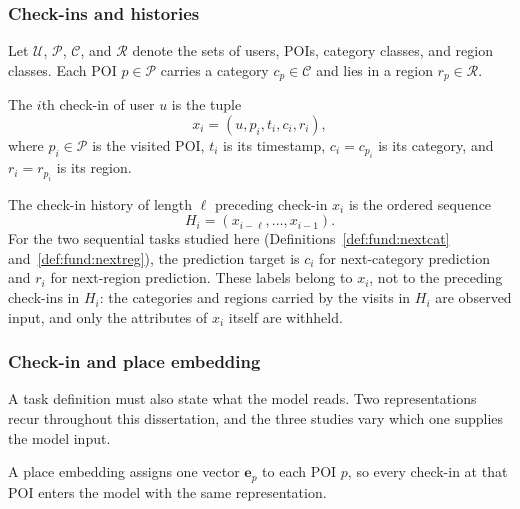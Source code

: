 \subsubsection{Check-ins and histories}

Let $\mathcal{U}$, $\mathcal{P}$, $\mathcal{C}$, and $\mathcal{R}$ denote the sets of
users, POIs, category classes, and region classes. Each POI $p\in\mathcal{P}$ carries a
category $c_p\in\mathcal{C}$ and lies in a region $r_p\in\mathcal{R}$.

\begin{definition}[Check-in]\label{def:fund:checkin}
    The $i$th check-in of user $u$ is the tuple
    \begin{equation}
        x_i=(u,p_i,t_i,c_i,r_i),
    \end{equation}
    where $p_i\in\mathcal{P}$ is the visited POI, $t_i$ is its timestamp,
    $c_i=c_{p_i}$ is its category, and $r_i=r_{p_i}$ is its region.
\end{definition}

\begin{definition}\label{def:fund:history}
    The check-in history of length $\ell$ preceding check-in $x_i$ is the ordered sequence
    \begin{equation}
        H_i=(x_{i-\ell},\ldots,x_{i-1}).
    \end{equation}
    For the two sequential tasks studied here (Definitions~\ref{def:fund:nextcat}
    and~\ref{def:fund:nextreg}), the prediction target is $c_i$ for next-category
    prediction and $r_i$ for next-region prediction. These labels belong to $x_i$, not
    to the preceding check-ins in $H_i$: the categories and regions carried by the
    visits in $H_i$ are observed input, and only the attributes of $x_i$ itself are
    withheld.
\end{definition}



\subsubsection{Check-in and place embedding}

A task definition must also state what the model reads. Two representations recur
throughout this dissertation, and the three studies vary which one supplies the model
input.

\begin{definition}\label{def:fund:placelevel}
    A place embedding assigns one vector $\mathbf{e}_p$ to each POI $p$, so every check-in
    at that POI enters the model with the same representation.
\end{definition}

